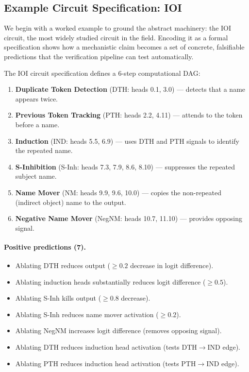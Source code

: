 \documentclass{article}
\begin{document}
\subsection{Example Circuit Specification: IOI}

\label{appendix:ioi-detail}

We begin with a worked example to ground the abstract machinery: the IOI circuit,
the most widely studied circuit in the field.
Encoding it as a formal specification  shows how a mechanistic claim becomes a set of concrete, falsifiable predictions that the verification pipeline can test automatically.

The IOI circuit specification defines a 6-step computational DAG:

\begin{enumerate}[nosep]
    \item \textbf{Duplicate Token Detection} (DTH: heads 0.1, 3.0) --- detects that a name appears twice.
    \item \textbf{Previous Token Tracking} (PTH: heads 2.2, 4.11) --- attends to the token before a name.
    \item \textbf{Induction} (IND: heads 5.5, 6.9) --- uses DTH and PTH signals to identify the repeated name.
    \item \textbf{S-Inhibition} (S-Inh: heads 7.3, 7.9, 8.6, 8.10) --- suppresses the repeated subject name.
    \item \textbf{Name Mover} (NM: heads 9.9, 9.6, 10.0) --- copies the non-repeated (indirect object) name to the output.
    \item \textbf{Negative Name Mover} (NegNM: heads 10.7, 11.10) --- provides opposing signal.
\end{enumerate}

\paragraph{Positive predictions (7).}
\begin{itemize}[nosep]
    \item Ablating DTH reduces output ($\geq 0.2$ decrease in logit difference).
    \item Ablating induction heads substantially reduces logit difference ($\geq 0.5$).
    \item Ablating S-Inh kills output ($\geq 0.8$ decrease).
    \item Ablating S-Inh reduces name mover activation ($\geq 0.2$).
    \item Ablating NegNM increases logit difference (removes opposing signal).
    \item Ablating DTH reduces induction head activation (tests DTH$\rightarrow$IND edge).
    \item Ablating PTH reduces induction head activation (tests PTH$\rightarrow$IND edge).
\end{itemize}
\end{document}
